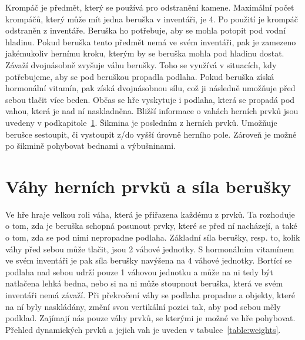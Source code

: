 Krompáč je předmět, který se používá pro odstranění kamene. Maximální počet krompáčů, který může mít jedna beruška v inventáři, je 4. Po použití je krompáč odstraněn z inventáře.
Beruška ho potřebuje, aby se mohla potopit pod vodní hladinu. Pokud beruška tento předmět nemá ve svém inventáři, pak je zamezeno jakémukoliv hernímu kroku, kterým by se beruška mohla pod hladinu dostat.
Závaží dvojnásobně zvyšuje váhu berušky. Toho se využívá v situacích, kdy potřebujeme, aby se pod beruškou propadla podlaha. 
Pokud beruška získá hormonální vitamín, pak získá dvojnásobnou sílu, což ji následně umožňuje před sebou tlačit více beden.
Občas se hře vyskytuje i podlaha, která se propadá pod vahou, která je nad ní naskladněna. Bližší informace o vahách herních prvků jsou uvedeny v podkapitole~\ref{section:weight}.
Šikmina je posledním z herních prvků. Umožňuje berušce sestoupit, či vystoupit z/do vyšší úrovně herního pole. Zároveň je možné po šikmině pohybovat bednami a výbušninami.

\section{Váhy herních prvků a síla berušky}
\label{section:weight}
Ve hře hraje velkou roli váha, která je přiřazena každému z prvků. Ta rozhoduje o tom, zda je beruška schopná posunout prvky, které se před ní nacházejí, a také o tom, zda se pod nimi nepropadne podlaha. Základní síla berušky, resp. to, kolik váhy před sebou může tlačit, jsou 2 váhové jednotky. S hormonálním vitamínem ve svém inventáři je pak síla berušky navýšena na 4 váhové jednotky. Bortící se podlaha nad sebou udrží pouze 1 váhovou jednotku a může na ni tedy být natlačena lehká bedna, nebo si na ni může stoupnout beruška, která ve svém inventáři nemá závaží. Při překročení váhy se podlaha propadne a objekty, které na ní byly naskládány, změní svou vertikální pozici tak, aby pod sebou měly podklad. Zajímají nás pouze váhy prvků, se kterými je možné ve hře pohybovat. Přehled dynamických prvků a jejich vah je uveden v tabulce~\ref{table:weights}.

